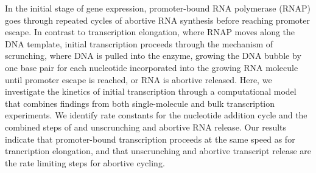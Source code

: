 In the initial stage of gene expression, promoter-bound RNA polymerase (RNAP)
goes through repeated cycles of abortive RNA synthesis before reaching
promoter escape. In contrast to transcription elongation, where RNAP moves
along the DNA template, initial transcription proceeds through the mechanism
of scrunching, where DNA is pulled into the enzyme, growing the DNA bubble by
one base pair for each nucleotide incorporated into the growing RNA molecule
until promoter escape is reached, or RNA is abortive released. Here, we
investigate the kinetics of initial transcription through a computational
model that combines findings from both single-molecule and bulk transcription
experiments. We identify rate constants for the nucleotide addition cycle and
the combined steps of and unscrunching and abortive RNA release. Our results
indicate that promoter-bound transcription proceeds at the same speed as for
trancription elongation, and that unscrunching and abortive transcript release
are the rate limiting steps for abortive cycling.
